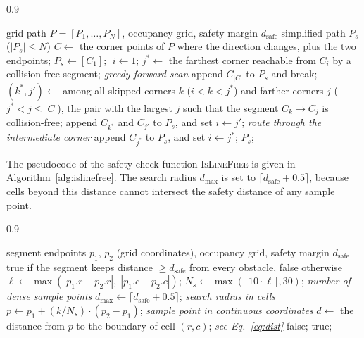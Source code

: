 \begin{algorithm}[!t]
\caption{Safety-distance-aware path simplification}
\label{alg:simplify}
\begin{spacing}{0.9}
\begin{algorithmic}[1]
\REQUIRE grid path $P = [P_1, \ldots, P_N]$, occupancy grid, safety margin $d_{\mathrm{safe}}$
\ENSURE simplified path $P_s$ ($|P_s| \leq N$)
\STATE $C \gets$ the corner points of $P$ where the direction changes, plus the two endpoints;
\STATE $P_s \gets [C_1]$; $\; i \gets 1$;
\STATE $j^{*} \gets$ the farthest corner reachable from $C_i$ by a collision-free segment; \quad\textit{greedy forward scan}
\STATE append $C_{|C|}$ to $P_s$ and break;
\ENDIF
\STATE $(k^{*}, j') \gets$ among all skipped corners $k$ ($i < k < j^{*}$) and farther corners $j$ ($j^{*} < j \leq |C|$), the pair with the largest $j$ such that the segment $C_k \to C_j$ is collision-free;
\STATE append $C_{k^{*}}$ and $C_{j'}$ to $P_s$, and set $i \gets j'$; \quad\textit{route through the intermediate corner}
\ELSE
\STATE append $C_{j^{*}}$ to $P_s$, and set $i \gets j^{*}$;
\ENDIF
\ENDWHILE
\RETURN $P_s$;
\end{algorithmic}
\end{spacing}
\end{algorithm}

The pseudocode of the safety-check function \textsc{IsLineFree} is given in Algorithm~\textcolor{blue}{\ref{alg:islinefree}}. The search radius $d_{\max}$ is set to $\lceil d_{\mathrm{safe}} + 0.5 \rceil$, because cells beyond this distance cannot intersect the safety distance of any sample point.

\begin{algorithm}[!t]
\caption{IsLineFree }
\label{alg:islinefree}
\begin{spacing}{0.9}
\begin{algorithmic}[1]
\REQUIRE segment endpoints $p_1$, $p_2$ (grid coordinates), occupancy grid, safety margin $d_{\mathrm{safe}}$
\ENSURE true if the segment keeps distance $\geq d_{\mathrm{safe}}$ from every obstacle, false otherwise
\STATE $\ell \gets \max(|p_1.r - p_2.r|,\; |p_1.c - p_2.c|)$;
\STATE $N_s \gets \max(\lceil 10 \cdot \ell \rceil, 30)$; \quad\textit{number of dense sample points}
\STATE $d_{\max} \gets \lceil d_{\mathrm{safe}} + 0.5 \rceil$; \quad\textit{search radius in cells}
\STATE $p \gets p_1 + (k / N_s) \cdot (p_2 - p_1)$; \quad\textit{sample point in continuous coordinates}
\STATE $d \gets$ the distance from $p$ to the boundary of cell $(r, c)$; \quad\textit{see Eq.~\textcolor{blue}{\eqref{eq:dist}}}
\STATE \RETURN false;
\ENDIF
\ENDIF
\ENDFOR
\ENDFOR
\RETURN true;
\end{algorithmic}
\end{spacing}
\end{algorithm}

